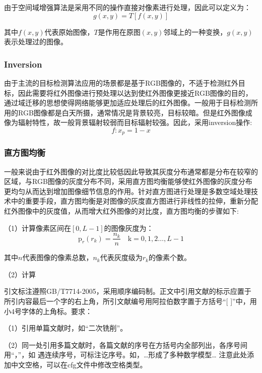 由于空间域增强算法是采用不同的操作直接对像素进行处理，因此可以定义为：
\begin{equation}
  g(x, y)=T[f(x, y)]
\end{equation}

其中$f(x, y)$代表原始图像，$T$是作用在原图$(x, y)$邻域上的一种变换，$g(x, y)$表示处理过的图像。

\subsubsection{Inversion}
由于主流的目标检测算法应用的场景都是基于RGB图像的，不适于检测红外目标，因此需要将红外图像进行预处理以达到使红外图像更接近RGB图像的目的，通过域迁移的思想使得网络能够更加适应处理后的红外图像。一般用于目标检测所用的RGB图像都是白天所摄，通常情况是背景较亮，目标较暗。但是红外图像成像为辐射特性，故一般背景辐射较弱而目标辐射较强。因此，采用inversion操作:
\begin{equation}
  f: x_{p}=1-x
\end{equation}

\subsubsection{直方图均衡}
一般来说由于红外图像的对比度比较低因此导致其灰度分布通常都是分布在较窄的区域，与RGB图像的灰度分布不同，采用直方图均衡能够使红外图像的灰度分布更均匀从而达到增加图像细节信息的作用。针对直方图进行处理是多数空域处理技术中的重要手段，直方图均衡是对图像的灰度直方图进行非线性的拉伸，重新分配红外图像中的灰度值，从而增大红外图像的对比度，直方图均衡的步骤如下: 

（1）计算像素区间在$[0,L-1]$的图像灰度为：
\begin{equation}
  \mathrm{p}_{r}\left(r_{k}\right)=\frac{n_{k}}{n} \quad \mathrm{k}=0,1,2 \ldots, L-1
\end{equation}

其中$n$代表图像的像素总数，$n_{k}$代表灰度级为$r_{k}$的像素个数。

（2）计算








引文标注遵照GB/T7714-2005，采用顺序编码制。正文中引用文献的标示应置于所引内容最后一个字的右上角，所引文献编号用阿拉伯数字置于方括号“[ ]”中，用小4号字体的上角标。要求：

（1）引用单篇文献时，如“二次铣削\cite{cnproceed}”。

（2）同一处引用多篇文献时，各篇文献的序号在方括号内全部列出，各序号间用“，”，如
遇连续序号，可标注讫序号。如，…形成了多种数学模型\cite{cnarticle,cnproceed}…
注意此处添加中文空格，可以在cfg文件中修改空格类型。

